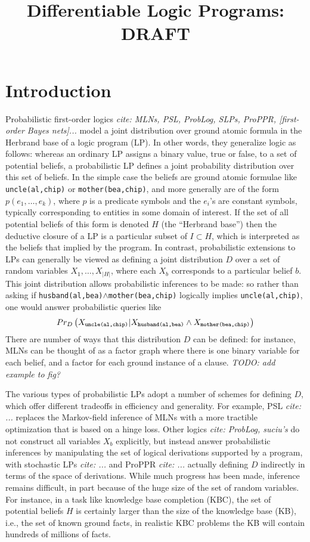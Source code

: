 \documentclass[12pt]{article}
\title{Differentiable Logic Programs: DRAFT}
\newcommand{\yy}[1]{\textit{TODO: {#1}}}
\newcommand{\ct}[1]{\textit{cite: {#1}}}
\newcommand{\cd}[1]{{\small \texttt{#1}}}
\begin{document}
 

\section{Introduction}

Probabilistic first-order logics \ct{MLNs, PSL, ProbLog, SLPs, ProPPR,
  [first-order Bayes nets]...} model a joint distribution over ground
atomic formula in the Herbrand base of a logic program (LP).  In other
words, they generalize logic as follows: whereas an ordinary LP
assigns a binary value, true or false, to a set of potential beliefs,
a probabilistic LP defines a joint probability distribution over this
set of beliefs.  In the simple case the beliefs are ground atomic
formulae like \cd{uncle(al,chip)} or \cd{mother(bea,chip)},
and more generally are of the form $p(e_1,\ldots,e_k)$, where $p$ is a
predicate symbols and the $e_i$'s are constant symbols, typically
corresponding to entities in some domain of interest.  If the set of
all potential beliefs of this form is denoted $H$ (the ``Herbrand
base'') then the deductive closure of a LP is a particular subset of
$I\subset H$, which is interpreted as the beliefs that implied by the
program.  In contrast, probabilistic extensions to LPs can generally
be viewed as defining a joint distribution $D$ over a set of random
variables $X_1,\ldots,X_{|H|}$, where each $X_b$ corresponds to a
particular belief $b$.  This joint distribution allows probabilistic
inferences to be made: so rather than asking if
\cd{husband(al,bea)$\wedge$mother(bea,chip)} logically implies
\cd{uncle(al,chip)}, one would answer probabilistic queries like
\[ Pr_D\left (X_\cd{uncle(al,chip)} | X_\cd{husband(al,bea)} \wedge X_\cd{mother(bea,chip)} \right)
\] 
There are number of ways that this distribution $D$ can be defined:
for instance, MLNs can be thought of as a factor graph where there is
one binary variable for each belief, and a factor for each ground
instance of a clause. \yy{add example to fig?}  

The various types of probabilistic LPs adopt a number of schemes for
defining $D$, which offer different tradeoffs in efficiency and
generality.  For example, PSL \ct{...} replaces the Markov-field
inference of MLNs with a more tractible optimization that is based on
a hinge loss.  Other logics \ct{ProbLog, suciu's} do not construct all
variables $X_b$ explicitly, but instead answer probabilistic
inferences by manipulating the set of logical derivations supported by
a program, with stochastic LPs \ct{...} and ProPPR \ct{...} actually
defining $D$ indirectly in terms of the space of derivations.  While
much progress has been made, inference remains difficult, in part
because of the huge size of the set of random variables. For instance,
in a task like knowledge base completion (KBC), the set of potential
beliefs $H$ is certainly larger than the size of the knowledge base
(KB), i.e., the set of known ground facts, in realistic KBC problems
the KB will contain hundreds of millions of facts.
\end{document}
